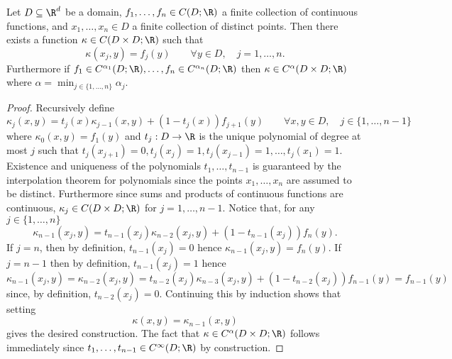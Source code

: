 {\begin{lemma}
\label{lemma:stich_kernel}
Let \(D \subseteq \R^d\) be a domain, \(f_1,\dots,f_n \in C(D;\R)\) a finite collection of continuous functions, and
\(x_1,\dots,x_n \in D\) a finite collection of distinct points. Then there exists a function \(\kappa \in C(D \times D;\R)\)
such that
\[\kappa(x_j, y) = f_j(y) \qquad \forall y \in D, \quad j=1,\dots,n.\]
Furthermore if \(f_1 \in C^{\alpha_1}(D;\R), \dots, f_n \in C^{\alpha_n}(D;\R)\) then \(\kappa \in C^{\alpha}(D \times D;\R)\)
where \(\alpha = \min_{j \in \{1,\dots,n\}} \alpha_j\).
\end{lemma}
\begin{proof}
Recursively define
\[\kappa_{j}(x,y) = t_{j}(x) \kappa_{j-1}(x,y) + (1 - t_{j}(x)) f_{j+1}(y) \qquad \forall x,y \in D, \quad j \in \{1,\dots,n-1\}\]
where \(\kappa_0(x,y) = f_1(y)\) and \(t_j : D \to \R\) is the unique polynomial of degree at most \(j\)
such that \(t_j(x_{j+1}) = 0, t_j(x_j) = 1, t_j(x_{j-1}) = 1, \dots, t_j(x_1) = 1\). Existence and uniqueness of 
the polynomials \(t_1,\dots,t_{n-1}\) is guaranteed by the interpolation theorem for polynomials since the 
points \(x_1,\dots,x_n\) are assumed to be distinct. Furthermore since sums and products of continuous functions are 
continuous, \(\kappa_j \in C(D \times D;\R)\) for \(j=1,\dots,n-1\). Notice that, for any \(j \in \{1,\dots,n\}\)
\[\kappa_{n-1}(x_j,y) = t_{n-1}(x_j) \kappa_{n-2}(x_j,y) + (1 - t_{n-1}(x_j)) f_{n}(y).\]
If \(j=n\), then by definition, \(t_{n-1}(x_j) = 0\) hence \(\kappa_{n-1}(x_j,y) = f_n(y)\).
If \(j=n-1\) then by definition, \(t_{n-1}(x_j) = 1\) hence
\[\kappa_{n-1}(x_j,y) = \kappa_{n-2}(x_j,y) = t_{n-2}(x_j) \kappa_{n-3}(x_j,y) + (1 - t_{n-2}(x_j)) f_{n-1}(y) = f_{n-1}(y) \]
since, by definition, \(t_{n-2}(x_j) = 0\). Continuing this by induction shows that setting
\[\kappa(x,y) = \kappa_{n-1}(x,y)\]
gives the desired construction. The fact that \(\kappa \in C^{\alpha}(D \times D;\R)\) follows immediately since \(t_1,\dots,t_{n-1} \in C^\infty (D;\R)\) by construction.
\end{proof}

}
